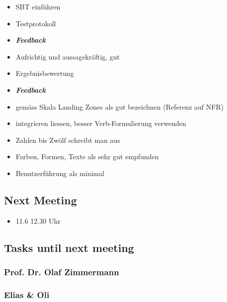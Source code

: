 \begin{itemize}
\item SBT einführen
\item Testprotokoll 
\item \emph{\textbf{Feedback}}
\item Aufrichtig und aussagekräftig, gut
\item Ergebnisbewertung 
\item \emph{\textbf{Feedback}}
\item gemäss Skala Landing Zones als gut bezeichnen (Referenz auf NFR)
\item integrieren liessen, besser Verb-Formulierung verwenden
\item Zahlen bis Zwölf schreibt man aus
\item Farben, Formen, Texte als sehr gut empfunden
\item Benutzerführung als minimal
\end{itemize}

\hypertarget{next-meeting}{%
\subsection*{Next Meeting}\label{next-meeting}}

\begin{itemize}
\item 11.6 12.30 Uhr
\end{itemize}

\hypertarget{tasks-until-next-meeting}{%
\subsection*{Tasks until next meeting}\label{tasks-until-next-meeting}}

\hypertarget{prof-dr-olaf-zimmermann}{%
\subsubsection*{Prof. Dr. Olaf
Zimmermann}\label{prof-dr-olaf-zimmermann}}

\hypertarget{elias--oli}{%
\subsubsection*{Elias \& Oli}\label{elias--oli}}